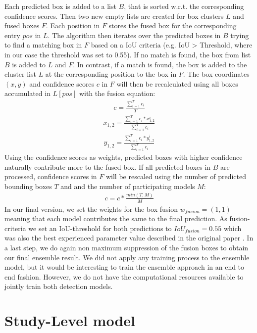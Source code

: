 Each predicted box is added to a list $B$, that is sorted w.r.t. the corresponding confidence scores. Then two new empty lists are created for box clusters $L$ and fused boxes $F$. Each position in $F$ stores the fused box for the corresponding entry $pos$ in $L$. The algorithm then iterates over the predicted boxes in $B$ trying to find a matching box in $F$ based on a \ac{IoU} criteria (e.g. IoU > Threshold, where in our case the threshold was set to 0.55). If no match is found, the box from list $B$ is added to $L$ and $F$. In contrast, if a match is found, the box is added to the cluster list $L$ at the corresponding position to the box in $F$. The box coordinates $(x,y)$ and confidence scores $c$ in $F$ will then be recalculated using all boxes accumulated in $L[pos]$ with the fusion equation:
\begin{align}
	c = \frac{\sum_{i=1}^{T}c_i}{T}
\end{align}
\begin{align}
	x_{1,2} = \frac{\sum_{i=1}^{T} c_i * x_{1,2}^i}{\sum_{i=1}^{T} c_i}
\end{align}
\begin{align}
	y_{1,2} = \frac{\sum_{i=1}^{T} c_i * y_{1,2}^i}{\sum_{i=1}^{T} c_i}
\end{align}
Using the confidence scores as weights, predicted boxes with higher confidence naturally contribute more to the fused box.
If all predicted boxes in $B$ are processed, confidence scores in $F$ will be rescaled using the number of predicted bounding boxes $T$ and and the number of participating models $M$:
\begin{align}
	c = c * \frac{min(T,M)}{M}
\end{align}
In our final version, we set the weights for the box fusion $w_{fusion} = (1,1)$ meaning that each model contributes the same to the final prediction.
As fusion-criteria we set an \ac{IoU}-threshold for both predictions to $IoU_{fusion} = 0.55$ which was also the best experienced parameter value described in the original paper \autocite{weightedBoxFusion}. In a last step, we do again non maximum suppression of the fusion boxes to obtain our final ensemble result. 
We did not apply any training process to the ensemble model, but it would be interesting to train the ensemble approach in an end to end fashion. However, we do not have the computational resources available to jointly train both detection models.



\section{Study-Level model}


